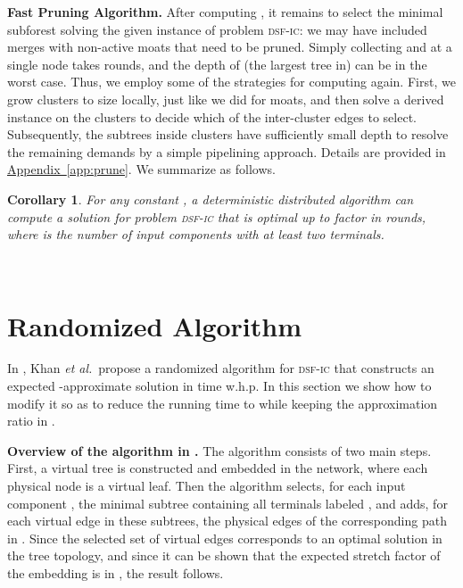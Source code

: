 \documentclass[letterpaper,11pt]{article}
\newtheorem{corollary}[theorem]{Corollary}
\newcommand{\namedref}[2]{\hyperref[#2]{#1~\ref*{#2}}}
\newcommand{\appref}[1]{\namedref{Appendix}{#1}}
\newcommand{\sfic}{\textsc{dsf-ic}\xspace}
\renewcommand{\paragraph}[1]{\smallskip\par\noindent\textbf{#1}}
\begin{document}
\paragraph{Fast Pruning Algorithm.}
\label{sec:prune}
After computing , it remains to select the minimal
subforest solving the given instance of problem \sfic: we may have
included merges with non-active moats that need to be pruned.
Simply collecting  and  at a single node takes
 rounds, and the depth of (the largest tree in)  can be
 in the worst case. Thus, we employ some of the strategies for
computing  again. First, we grow clusters to size  locally, just like
we did for moats, and then solve a derived instance on the clusters to decide
which of the inter-cluster edges to select. Subsequently, the subtrees inside
clusters have sufficiently small depth to resolve the remaining demands by a
simple pipelining approach. Details are provided in \appref{app:prune}. We
summarize as follows.
\begin{corollary}\label{coro:2+eps_distributed}
For any constant , a deterministic distributed algorithm can
compute a solution for problem \sfic that is optimal up to factor
 in  rounds,
where  is the number of input components with at least two terminals.
\end{corollary}
\
\section{Randomized Algorithm}
\label{sec-alg2}
In \cite{KKMPT-12}, Khan \textit{et al.}\ propose a randomized
algorithm for \sfic that constructs an 
expected -approximate solution in  time
w.h.p.
In this section we
show how to modify it so as to reduce the running time to
 while keeping the approximation ratio
in .

\paragraph{Overview of the algorithm in \cite{KKMPT-12}.}
The algorithm consists of two main steps. First, a
virtual tree is constructed and embedded in the network, where each
physical node is a virtual leaf.  Then the algorithm selects, for each
input component , the minimal subtree containing all terminals
labeled , and adds, for each virtual edge in these
subtrees, the physical edges of the corresponding path in . Since
the selected set of virtual
edges corresponds to an optimal solution in the tree topology, and
since it can be shown that the expected stretch factor of the embedding is in
, the result follows.
\end{document}
